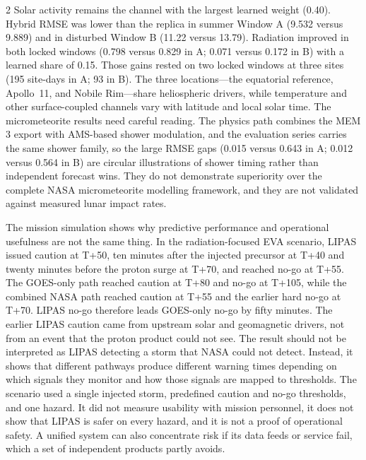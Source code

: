 \begin{multicols}{2}
Solar activity remains the channel with the largest learned weight (0.40). Hybrid RMSE was lower than the replica in summer Window A (9.532 versus 9.889) and in disturbed Window B (11.22 versus 13.79). Radiation improved in both locked windows (0.798 versus 0.829 in A; 0.071 versus 0.172 in B) with a learned share of 0.15. Those gains rested on two locked windows at three sites (195 site-days in A; 93 in B). The three locations---the equatorial reference, Apollo~11, and Nobile Rim---share heliospheric drivers, while temperature and other surface-coupled channels vary with latitude and local solar time. The micrometeorite results need careful reading. The physics path combines the MEM 3 export with AMS-based shower modulation, and the evaluation series carries the same shower family, so the large RMSE gaps (0.015 versus 0.643 in A; 0.012 versus 0.564 in B) are circular illustrations of shower timing rather than independent forecast wins. They do not demonstrate superiority over the complete NASA micrometeorite modelling framework, and they are not validated against measured lunar impact rates.

The mission simulation shows why predictive performance and operational usefulness are not the same thing. In the radiation-focused EVA scenario, LIPAS issued caution at T+50, ten minutes after the injected precursor at T+40 and twenty minutes before the proton surge at T+70, and reached no-go at T+55. The GOES-only path reached caution at T+80 and no-go at T+105, while the combined NASA path reached caution at T+55 and the earlier hard no-go at T+70. LIPAS no-go therefore leads GOES-only no-go by fifty minutes. The earlier LIPAS caution came from upstream solar and geomagnetic drivers, not from an event that the proton product could not see. The result should not be interpreted as LIPAS detecting a storm that NASA could not detect. Instead, it shows that different pathways produce different warning times depending on which signals they monitor and how those signals are mapped to thresholds. The scenario used a single injected storm, predefined caution and no-go thresholds, and one hazard. It did not measure usability with mission personnel, it does not show that LIPAS is safer on every hazard, and it is not a proof of operational safety. A unified system can also concentrate risk if its data feeds or service fail, which a set of independent products partly avoids.


\end{multicols}
